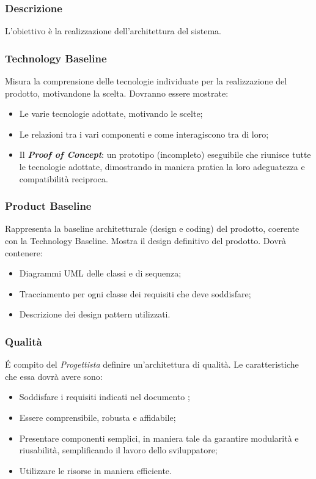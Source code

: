 \subsubsection{Descrizione}
L’obiettivo è la realizzazione dell’architettura del sistema.

\subsubsection{Technology Baseline}
Misura la comprensione delle tecnologie individuate per la realizzazione del prodotto, motivandone la scelta. 
Dovranno essere mostrate:
\begin{itemize}
	\item Le varie tecnologie adottate, motivando le scelte;
	\item Le relazioni tra i vari componenti e come interagiscono tra di loro;
	\item Il \textit{\textbf{Proof of Concept}}: un prototipo (incompleto) eseguibile che riunisce tutte le tecnologie adottate, dimostrando in maniera pratica la loro adeguatezza e compatibilità reciproca. 
\end{itemize}

\subsubsection{Product Baseline}
Rappresenta la baseline architetturale (design e coding) del prodotto, coerente con la Technology Baseline. Mostra il design definitivo del prodotto.
Dovrà contenere:
\begin{itemize}
	\item Diagrammi UML delle classi e di sequenza;
	\item Tracciamento per ogni classe dei requisiti che deve soddisfare;
	\item Descrizione dei design pattern utilizzati.
\end{itemize}

\subsubsection{Qualità}
\'E compito del \textit{Progettista} definire un'architettura di qualità. Le caratteristiche che essa dovrà avere sono:
\begin{itemize}
  \item Soddisfare i requisiti indicati nel documento \AdR;
  \item Essere comprensibile, robusta e affidabile;
  \item Presentare componenti semplici, in maniera tale da garantire modularità e riusabilità, semplificando il lavoro dello sviluppatore;
  \item Utilizzare le risorse in maniera efficiente.
\end{itemize}

